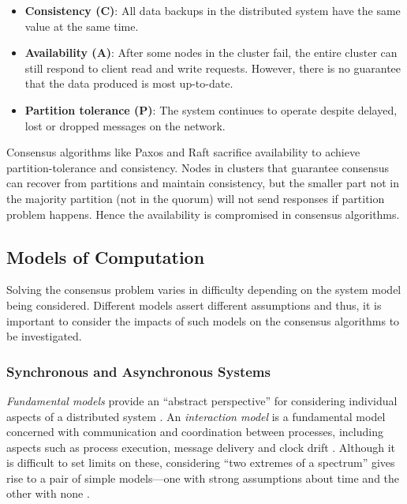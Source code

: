 \documentclass[12pt, a4paper]{article}
\begin{document}
\begin{itemize}
	\item \textbf{Consistency (C)}: All data backups in the distributed system have
    the same value at the same time.
	\item \textbf{Availability (A)}: After some nodes in the cluster fail, the entire
    cluster can still respond to client read and write requests. However, there
    is no guarantee that the data produced is most up-to-date.
	\item \textbf{Partition tolerance (P)}: The system continues to operate despite
    delayed, lost or dropped messages on the network.
\end{itemize}

Consensus algorithms like Paxos and Raft sacrifice availability to achieve partition-tolerance and consistency. Nodes in clusters that guarantee consensus can recover from partitions and maintain consistency, but the smaller part not in the majority partition (not in the quorum) will not send responses if partition problem happens. Hence the availability is compromised in consensus algorithms.

\subsection{Models of Computation} \label{sec:fundamental-models}

Solving the consensus problem varies in difficulty depending on the system model
being considered. Different models assert different assumptions and thus, it is
important to consider the impacts of such models on the consensus algorithms to
be investigated.

\subsubsection{Synchronous and Asynchronous Systems}

\textit{Fundamental models} provide an ``abstract perspective'' for considering
individual aspects of a distributed system \cite{coulouris2005distributed}. An
\textit{interaction model} is a fundamental model concerned with communication
and coordination between processes, including aspects such as process execution,
message delivery and clock drift \cite{coulouris2005distributed}. Although it is
difficult to set limits on these, considering ``two extremes of a spectrum''
gives rise to a pair of simple models---one with strong assumptions about time
and the other with none \cite{coulouris2005distributed, hadzilacos1994modular}.
\end{document}

